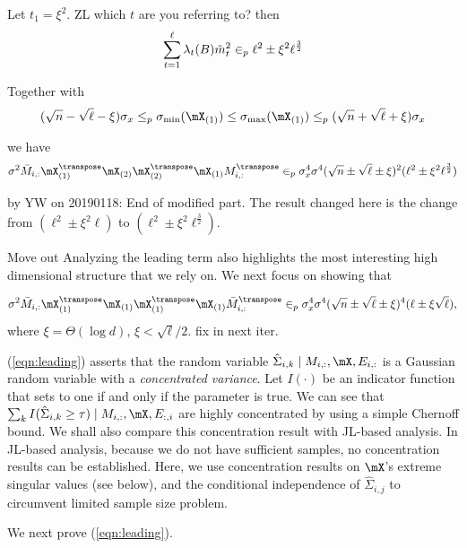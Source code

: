 Let $t_1 = \xi^2$. {\color{red} ZL which $t$ are you referring to?} then
\begin{equation}
    \sum^{\ell}_{t = 1}\lambda_{t}(B)\Tilde{m}^2_t \in_p  \ell^2  \pm \xi^2 \ell^{\frac{3}{2}}
\end{equation}

Together with 
\begin{equation}
    (\sqrt{n} - \sqrt{\ell} - \xi)\sigma_x
    \leq_p 
    \sigma_{\min}(\mX_{(1)})
    \leq
    \sigma_{\max}(\mX_{(1)})
    \leq_p
    (\sqrt{n} + \sqrt{\ell} + \xi)\sigma_x
\end{equation}

we have
\begin{equation}
    \sigma^2 \bar M_{i, :}\mX_{(1)}^{\transpose}\mX_{(2)}\mX_{(2)}^{\transpose}\mX_{(1)}M^{\transpose}_{i, :}  
    \in_p \sigma^4_x \sigma^4 (\sqrt{n} \pm \sqrt{\ell} \pm \xi)^2(\ell^2  \pm \xi^2 \ell^{\frac{3}{2}})
\end{equation}

{\color{red}by YW on 20190118: End of modified part. The result changed here is the change from $(\ell^2  \pm \xi^2 \ell)$ to $(\ell^2  \pm \xi^2 \ell^{\frac{3}{2}})$.}




{
\color{blue} 
Move out
Analyzing the leading term also highlights the most interesting high dimensional structure that we rely on. We next focus on showing that 

\begin{equation}\label{eqn:leading}
    \sigma^2 \bar M_{i, :}\mX_{(1)}^{\transpose}\mX_{(1)}\mX_{(1)}^{\transpose}\mX_{(1)}\bar M^{\transpose}_{i, :}  
    \in_p \sigma^4_x \sigma^4 (\sqrt{n} \pm \sqrt{\ell} \pm \xi)^4 (\ell \pm \xi \sqrt{\ell}), 
\end{equation}
where $\xi = \Theta(\log d) $, $\xi < \sqrt{\ell}/2$. {\color{red} fix in next iter.}

(\ref{eqn:leading}) asserts that the random variable $\hat \Sigma_{i, k} \mid M_{i, :}, \mX, E_{i,:}$ is a Gaussian random variable with a \emph{concentrated variance}. 
Let $I(\cdot)$ be an indicator function that sets to one if and only if the parameter is true. We can see that $\sum_{k} I(\hat \Sigma_{i, k} \geq \tau) \mid M_{i,:}, \mX, E_{:, i}$ are highly concentrated by using a simple Chernoff bound. 
We shall also compare this concentration result with JL-based analysis. In JL-based analysis, because we do not have sufficient samples, no concentration results can be established. Here, we use concentration results on $\mX$'s extreme singular values (see below), and the conditional independence of  
$\hat \Sigma_{i,j}$ to circumvent limited sample size problem. 

We next prove (\ref{eqn:leading}).
}

